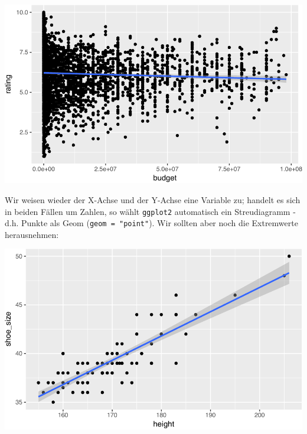 \documentclass[12pt,]{book}
\newenvironment{Shaded}{\begin{snugshade}}{\end{snugshade}}
\newcommand{\KeywordTok}[1]{\textcolor[rgb]{0.13,0.29,0.53}{\textbf{{#1}}}}
\newcommand{\DataTypeTok}[1]{\textcolor[rgb]{0.13,0.29,0.53}{{#1}}}
\newcommand{\DecValTok}[1]{\textcolor[rgb]{0.00,0.00,0.81}{{#1}}}
\newcommand{\StringTok}[1]{\textcolor[rgb]{0.31,0.60,0.02}{{#1}}}
\newcommand{\NormalTok}[1]{{#1}}
\begin{document}
\begin{center}\includegraphics[width=0.7\linewidth]{050_Daten_visualisieren_files/figure-latex/unnamed-chunk-15-1} \end{center}

Wir weisen wieder der X-Achse und der Y-Achse eine Variable zu; handelt
es sich in beiden Fällen um Zahlen, so wählt \texttt{ggplot2}
automatisch ein Streudiagramm - d.h. Punkte als Geom
(\texttt{geom\ =\ "point"}). Wir sollten aber noch die Extremwerte
herausnehmen:

\begin{Shaded}
\end{Shaded}

\begin{center}\includegraphics[width=0.7\linewidth]{050_Daten_visualisieren_files/figure-latex/unnamed-chunk-16-1} \end{center}
\end{document}
